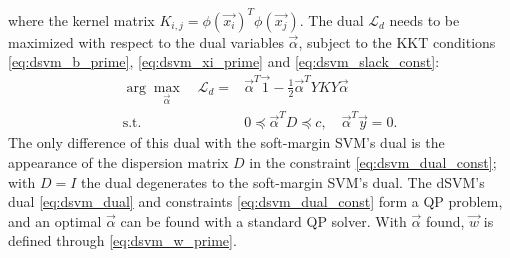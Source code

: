 %
where the kernel matrix $K_{i,j}=\phi(\vec{x_i})^T \phi(\vec{x_j})$.
The dual $\mathcal{L}_d$ needs to be maximized with respect to the dual
variables $\vec{\alpha}$, subject to the \ac{KKT} conditions
\eqref{eq:dsvm_b_prime}, \eqref{eq:dsvm_xi_prime} and
\eqref{eq:dsvm_slack_const}:
%
\begin{align}
  \arg\max_{\vec{\alpha}} \quad \mathcal{L}_d = & 
  \vec{\alpha}^T \vec{1} - \frac{1}{2} \vec{\alpha}^T Y K Y \vec{\alpha}
  \label{eq:dsvm_dual}
\\
  \text{s.t.} \quad &
  0 \preceq \vec{\alpha}^T D \preceq c, \quad \vec{\alpha}^T \vec{y} = 0.
  \label{eq:dsvm_dual_const}
\end{align}
%
The only difference of this dual with the soft-margin \ac{SVM}'s dual is the
appearance of the dispersion matrix $D$ in the constraint
\eqref{eq:dsvm_dual_const}; with $D=I$ the dual degenerates to the soft-margin \ac{SVM}'s
dual. 
%
The \ac{dSVM}'s dual \eqref{eq:dsvm_dual} and constraints
\eqref{eq:dsvm_dual_const} form a \ac{QP} problem, and an optimal
$\vec{\alpha}$ can be found with a standard \ac{QP} solver. With $\vec{\alpha}$
found, $\vec{w}$ is defined through \eqref{eq:dsvm_w_prime}. 

